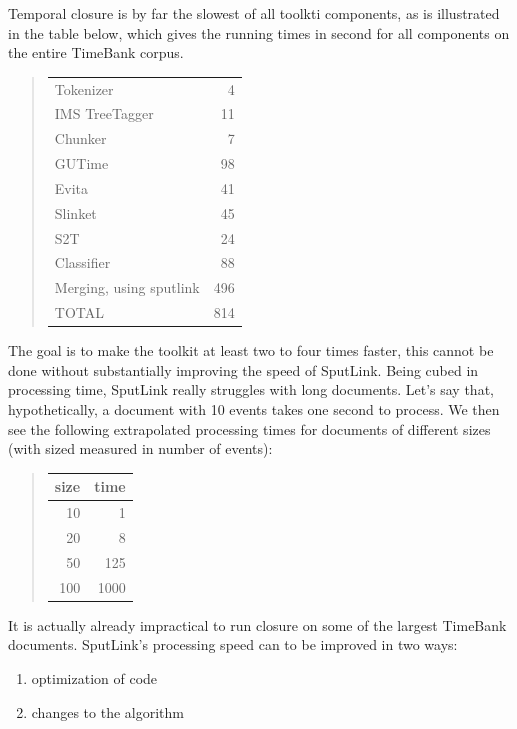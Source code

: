 \documentclass[11pt]{article}
\begin{document}
Temporal closure is by far the slowest of all toolkti components, as is illustrated in the table below, which gives the running times in second for all components on the entire TimeBank corpus.

\begin{quote}
\begin{tabular}{|l|r|}
\hline
Tokenizer 					&   4 \\
IMS TreeTagger 				&  11 \\
Chunker				 		&   7 \\
GUTime 						&  98 \\
Evita 						&  41 \\
Slinket						&  45 \\
S2T							&  24 \\
Classifier 					&  88 \\
Merging, using sputlink		& 496 \\
\hline
TOTAL 						& 814 \\
\hline
\end{tabular}
\end{quote}

The goal is to make the toolkit at least two to four times faster, this cannot be done without substantially improving the speed of SputLink. Being cubed in processing time, SputLink really struggles with long documents. Let's say that, hypothetically, a document with 10 events takes one second to process. We then see the following extrapolated processing times for documents of different sizes (with sized measured in number of events):

\begin{quote}
\begin{tabular}{|r|r|}
\hline
size	& time\\
\hline
 10  	&    1 \\
 20		&    8 \\
 50		&  125 \\
100		& 1000 \\
\hline
\end{tabular}
\end{quote}

It is actually already impractical to run closure on some of the largest TimeBank documents. SputLink's processing speed can to be improved in two ways:

\begin{enumerate}
\item optimization of code
\item changes to the algorithm
\end{enumerate}
\end{document}
